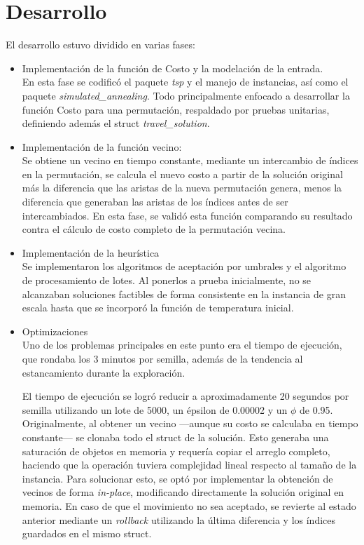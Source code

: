 \documentclass[12pt,letterpaper]{article}
\begin{document}
\section{Desarrollo}
El desarrollo estuvo dividido en varias fases:
\begin{itemize}
    \item Implementación de la función de Costo y la modelación de la entrada.\\
    En esta fase se codificó el paquete \textit{tsp} y el manejo de instancias, así como el paquete \textit{simulated\_annealing}. Todo principalmente enfocado a desarrollar la función Costo para una permutación, respaldado por pruebas unitarias, definiendo además el struct \textit{travel\_solution}.
    \item Implementación de la función vecino:\\
    Se obtiene un vecino en tiempo constante, mediante un intercambio de índices en la permutación, se calcula el nuevo costo a partir de la solución original más la diferencia que las aristas de la nueva permutación genera, menos la diferencia que generaban las aristas de los índices antes de ser intercambiados. En esta fase, se validó esta función comparando su resultado contra el cálculo de costo completo de la permutación vecina.
    \item Implementación de la heurística\\
    Se implementaron los algoritmos de aceptación por umbrales y el algoritmo de procesamiento de lotes. Al ponerlos a prueba inicialmente, no se alcanzaban soluciones factibles de forma consistente en la instancia de gran escala hasta que se incorporó la función de temperatura inicial.
    \item Optimizaciones\\
    Uno de los problemas principales en este punto era el tiempo de ejecución, que rondaba los 3 minutos por semilla, además de la tendencia al estancamiento durante la exploración. 
    
    El tiempo de ejecución se logró reducir a aproximadamente 20 segundos por semilla utilizando un lote de 5000, un épsilon de 0.00002 y un $\phi$ de 0.95. Originalmente, al obtener un vecino —aunque su costo se calculaba en tiempo constante— se clonaba todo el struct de la solución. Esto generaba una saturación de objetos en memoria y requería copiar el arreglo completo, haciendo que la operación tuviera complejidad lineal respecto al tamaño de la instancia. Para solucionar esto, se optó por implementar la obtención de vecinos de forma \textit{in-place}, modificando directamente la solución original en memoria. En caso de que el movimiento no sea aceptado, se revierte al estado anterior mediante un \textit{rollback} utilizando la última diferencia y los índices guardados en el mismo struct.
    

\end{itemize}
\end{document}
